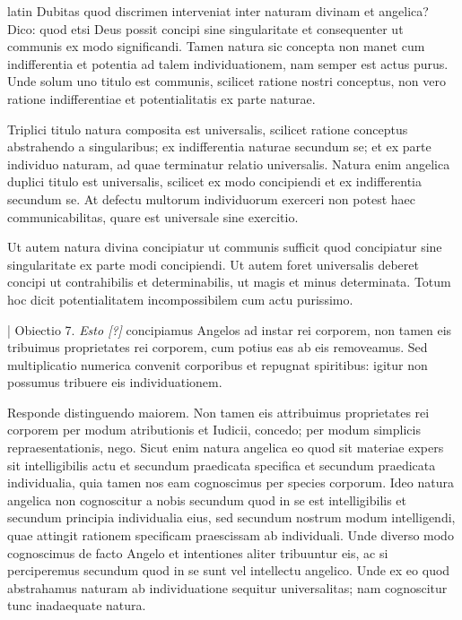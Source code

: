 \begin{otherlanguage*}{latin}
\pstart
 Dubitas quod discrimen interveniat inter naturam divinam et angelica? Dico: quod etsi Deus possit concipi sine singularitate et consequenter ut communis ex modo significandi. Tamen natura sic concepta non manet cum indifferentia et potentia ad talem individuationem, nam semper est actus purus. Unde solum uno titulo est communis, scilicet ratione nostri conceptus, non vero ratione indifferentiae et potentialitatis ex parte naturae. 
\pend

\pstart
 Triplici titulo natura composita est universalis, scilicet ratione conceptus abstrahendo a singularibus; ex indifferentia naturae secundum se; et ex parte individuo naturam, ad quae terminatur relatio universalis. Natura enim angelica duplici titulo est universalis, scilicet ex modo concipiendi et ex indifferentia secundum se. At defectu multorum individuorum exerceri non potest haec communicabilitas, quare est universale sine exercitio. 
\pend

\pstart
 Ut autem natura divina concipiatur ut communis sufficit quod concipiatur sine singularitate ex parte modi concipiendi. Ut autem foret universalis deberet concipi ut contrahibilis et determinabilis, ut magis et minus determinata. Totum hoc dicit potentialitatem incompossibilem cum actu purissimo. 
\pend

\pstart
 \textnormal{|}   Obiectio 7. \emph{Esto [?]} concipiamus Angelos ad instar rei corporem, non tamen eis tribuimus proprietates rei corporem, cum potius eas ab eis removeamus. Sed multiplicatio numerica convenit corporibus et repugnat spiritibus: igitur non possumus tribuere eis individuationem. 
\pend

\pstart
  Responde distinguendo maiorem. Non tamen eis attribuimus proprietates rei corporem per modum atributionis et Iudicii, concedo; per modum simplicis repraesentationis, nego. Sicut enim natura angelica eo quod sit materiae expers sit intelligibilis actu et secundum praedicata specifica et secundum praedicata individualia, quia tamen nos eam cognoscimus per species corporum. Ideo natura angelica non cognoscitur a nobis secundum quod in se est intelligibilis et secundum principia individualia eius, sed secundum nostrum modum intelligendi, quae attingit rationem specificam praescissam ab individuali. Unde diverso modo cognoscimus de facto Angelo et intentiones aliter tribuuntur eis, ac si perciperemus secundum quod in se sunt vel intellectu angelico. Unde ex eo quod abstrahamus naturam ab individuatione sequitur universalitas; nam cognoscitur tunc inadaequate natura. 
\pend


\end{otherlanguage*}
